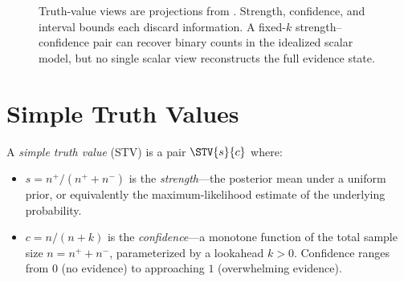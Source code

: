 \documentclass[11pt,openany]{report}
\begin{document}
\begin{figure}[htbp]
\centering
{}
\caption{Truth-value views are projections from \Evidence{}.
Strength, confidence, and interval bounds each discard information.
A fixed-$k$ strength--confidence pair can recover binary counts in the
idealized scalar model, but no single scalar view reconstructs the full
evidence state.}
\label{fig:tv-views-projections}
\end{figure}

\section{Simple Truth Values}

A \emph{simple truth value} (STV) is a pair $\STV{s}{c}$ where:
\begin{itemize}
\item $s = n^+ / (n^+ + n^-)$ is the \emph{strength}---the posterior mean
  under a uniform prior, or equivalently the maximum-likelihood estimate
  of the underlying probability.
\item $c = n / (n + k)$ is the \emph{confidence}---a monotone function of
  the total sample size $n = n^+ + n^-$, parameterized by a lookahead
  $k > 0$.  Confidence ranges from $0$ (no evidence) to approaching $1$
  (overwhelming evidence).
\end{itemize}
\end{document}
